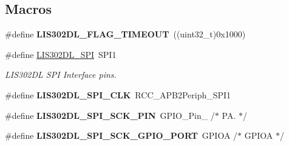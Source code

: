 \subsection*{Macros}
\begin{DoxyCompactItemize}
\item 
\hypertarget{group___s_t_m32_f4___d_i_s_c_o_v_e_r_y___l_i_s302_d_l___exported___constants_gacc2ef419ff00362800e740661afa725f}{\#define {\bfseries L\-I\-S302\-D\-L\-\_\-\-F\-L\-A\-G\-\_\-\-T\-I\-M\-E\-O\-U\-T}~((uint32\-\_\-t)0x1000)}\label{group___s_t_m32_f4___d_i_s_c_o_v_e_r_y___l_i_s302_d_l___exported___constants_gacc2ef419ff00362800e740661afa725f}

\item 
\hypertarget{group___s_t_m32_f4___d_i_s_c_o_v_e_r_y___l_i_s302_d_l___exported___constants_ga8cff72311f0176d3b0e6f56f5465eab5}{\#define \hyperlink{group___s_t_m32_f4___d_i_s_c_o_v_e_r_y___l_i_s302_d_l___exported___constants_ga8cff72311f0176d3b0e6f56f5465eab5}{L\-I\-S302\-D\-L\-\_\-\-S\-P\-I}~S\-P\-I1}\label{group___s_t_m32_f4___d_i_s_c_o_v_e_r_y___l_i_s302_d_l___exported___constants_ga8cff72311f0176d3b0e6f56f5465eab5}

\begin{DoxyCompactList}\small\item\em L\-I\-S302\-D\-L S\-P\-I Interface pins. \end{DoxyCompactList}\item 
\hypertarget{group___s_t_m32_f4___d_i_s_c_o_v_e_r_y___l_i_s302_d_l___exported___constants_gaf600adbeea67ef6ae3b9e1db3a352d7a}{\#define {\bfseries L\-I\-S302\-D\-L\-\_\-\-S\-P\-I\-\_\-\-C\-L\-K}~R\-C\-C\-\_\-\-A\-P\-B2\-Periph\-\_\-\-S\-P\-I1}\label{group___s_t_m32_f4___d_i_s_c_o_v_e_r_y___l_i_s302_d_l___exported___constants_gaf600adbeea67ef6ae3b9e1db3a352d7a}

\item 
\hypertarget{group___s_t_m32_f4___d_i_s_c_o_v_e_r_y___l_i_s302_d_l___exported___constants_ga61d31b85a26b5252d4399fec36805a77}{\#define {\bfseries L\-I\-S302\-D\-L\-\_\-\-S\-P\-I\-\_\-\-S\-C\-K\-\_\-\-P\-I\-N}~G\-P\-I\-O\-\_\-\-Pin\-\_                  /$\ast$ P\-A. $\ast$/}\label{group___s_t_m32_f4___d_i_s_c_o_v_e_r_y___l_i_s302_d_l___exported___constants_ga61d31b85a26b5252d4399fec36805a77}

\item 
\hypertarget{group___s_t_m32_f4___d_i_s_c_o_v_e_r_y___l_i_s302_d_l___exported___constants_gabbe958e5931857e9ade4ecd27ad77581}{\#define {\bfseries L\-I\-S302\-D\-L\-\_\-\-S\-P\-I\-\_\-\-S\-C\-K\-\_\-\-G\-P\-I\-O\-\_\-\-P\-O\-R\-T}~G\-P\-I\-O\-A                       /$\ast$ G\-P\-I\-O\-A $\ast$/}\label{group___s_t_m32_f4___d_i_s_c_o_v_e_r_y___l_i_s302_d_l___exported___constants_gabbe958e5931857e9ade4ecd27ad77581}


\end{DoxyCompactItemize}
